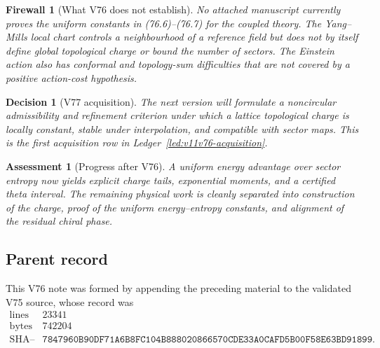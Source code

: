 \documentclass[11pt]{article}
\newtheorem{assessment}[theorem]{Assessment}
\newtheorem{firewall}[theorem]{Firewall}
\newtheorem{decision}[theorem]{Decision}
\begin{document}
\begin{firewall}[What V76 does not establish]
\label{fire:v11v76-boundary}
No attached manuscript currently proves the uniform constants in
(76.6)--(76.7) for the coupled theory.  The Yang--Mills local chart
controls a neighbourhood of a reference field but does not by itself
define global topological charge or bound the number of sectors.
The Einstein action also has conformal and topology-sum difficulties
that are not covered by a positive action-cost hypothesis.
\end{firewall}

\begin{decision}[V77 acquisition]
\label{dec:v11v76-next}
The next version will formulate a noncircular admissibility and
refinement criterion under which a lattice topological charge is
locally constant, stable under interpolation, and compatible with
sector maps.  This is the first acquisition row in
Ledger~\ref{led:v11v76-acquisition}.
\end{decision}

\begin{assessment}[Progress after V76]
\label{ass:v11v76-status}
A uniform energy advantage over sector entropy now yields explicit
charge tails, exponential moments, and a certified theta interval.
The remaining physical work is cleanly separated into construction of
the charge, proof of the uniform energy--entropy constants, and
alignment of the residual chiral phase.
\end{assessment}

\subsection{Parent record}

This V76 note was formed by appending the preceding material to the
validated V75 source, whose record was
\[
\begin{array}{c|c}
\text{lines}&23341\\
\text{bytes}&742204\\
\text{SHA--256}&
\texttt{7847960B90DF71A6B8FC104B888020866570CDE33A0CAFD5B00F58E63BD91899}.
\end{array}                                                     \tag{76.15}
\]

\end{document}
